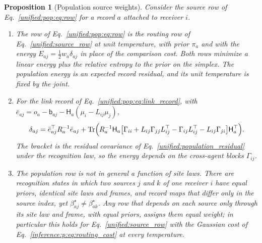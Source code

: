\documentclass[11pt]{article}
\newtheorem{proposition}[theorem]{Proposition}
\theoremstyle{definition}
\theoremstyle{remark}
\providecommand{\Tr}{\operatorname{Tr}}
\begin{document}
\begin{proposition}[Population source weights]
\label{unified:pop:prop:row}
Consider the source row of Eq.~\eqref{unified:pop:eq:row} for a record $a$ attached to receiver $i$.
\begin{enumerate}
\item The row of Eq.~\eqref{unified:pop:eq:row} is the routing row of Eq.~\eqref{unified:source_row} at unit temperature, with prior $\pi_a$ and with the energy $E_{aj}=\tfrac12w_a\delta_{aj}$ in place of the comparison cost. Both rows minimize a linear energy plus the relative entropy to the prior on the simplex. The population energy is an expected record residual, and its unit temperature is fixed by the joint.
\item For the link record of Eq.~\eqref{unified:pop:eq:link_record}, with $\bar e_{aj}=o_a-\mathsf b_{aj}-\mathsf H_a(\mu_i-L_{ij}\mu_j)$,
\begin{equation}
\delta_{aj}=\bar e_{aj}^\top R_a^{-1}\bar e_{aj}+\Tr\Bigl(R_a^{-1}\mathsf H_a\bigl[\Gamma_{ii}+L_{ij}\Gamma_{jj}L_{ij}^\top-\Gamma_{ij}L_{ij}^\top-L_{ij}\Gamma_{ji}\bigr]\mathsf H_a^\top\Bigr).
\label{unified:pop:eq:link_residual}
\end{equation}
The bracket is the residual covariance of Eq.~\eqref{unified:population_residual} under the recognition law, so the energy depends on the cross-agent blocks $\Gamma_{ij}$.
\item The population row is not in general a function of site laws. There are recognition states in which two sources $j$ and $k$ of one receiver $i$ have equal priors, identical site laws and frames, and record maps that differ only in the source index, yet $\beta_{aj}^\star\ne\beta_{ak}^\star$. Any row that depends on each source only through its site law and frame, with equal priors, assigns them equal weight; in particular this holds for Eq.~\eqref{unified:source_row} with the Gaussian cost of Eq.~\eqref{inference:p:eq:routing_cost} at every temperature.
\end{enumerate}
\end{proposition}
\end{document}
